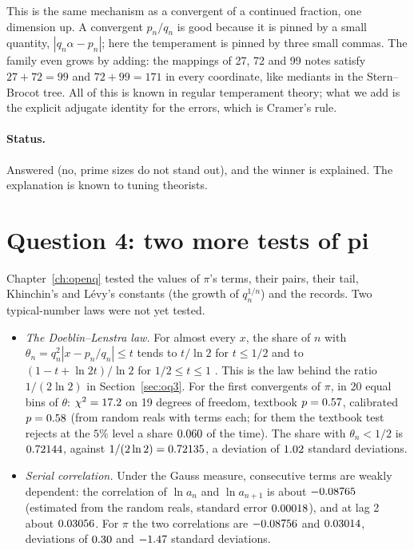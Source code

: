 This is the same mechanism as a convergent of a continued fraction, one dimension up. A convergent $p_n/q_n$ is good because it is pinned by a small quantity, $|q_n\alpha - p_n|$; here the temperament is pinned by three small commas. The family even grows by adding: the mappings of 27, 72 and 99 notes satisfy $27 + 72 = 99$ and $72 + 99 = 171$ in every coordinate, like mediants in the Stern--Brocot tree. All of this is known in regular temperament theory; what we add is the explicit adjugate identity for the errors, which is Cramer's rule.

\paragraph{Status.} Answered (no, prime sizes do not stand out), and the winner is explained. The explanation is known to tuning theorists.

\section{Question 4: two more tests of pi}\label{sec:ob4}

Chapter~\ref{ch:openq} tested the values of $\pi$'s terms, their pairs, their tail, Khinchin's and Lévy's constants (the growth of $q_n^{1/n}$) and the records. Two typical-number laws were not yet tested.

\begin{itemize}
\item \emph{The Doeblin--Lenstra law.} For almost every $x$, the share of $n$ with $\theta_n = q_n^2|x - p_n/q_n| \le t$ tends to $t/\ln 2$ for $t \le 1/2$ and to $(1 - t + \ln 2t)/\ln 2$ for $1/2 \le t \le 1$ \citep{BosmaJagerWiedijk1983}. This is the law behind the ratio $1/(2\ln 2)$ in Section~\ref{sec:oq3}. For the first \ObThN{} convergents of $\pi$, in 20 equal bins of $\theta$: $\chi^2 = 17.2$ on 19 degrees of freedom, textbook $p = 0.57$, calibrated $p = 0.58$ (from \ObCalN{} random reals with \ObCalLen{} terms each; for them the textbook test rejects at the $5\%$ level a share $0.060$ of the time). The share with $\theta_n < 1/2$ is $0.72144$, against $1/(2\ln 2) = 0.72135$, a deviation of $1.02$ standard deviations.
\item \emph{Serial correlation.} Under the Gauss measure, consecutive terms are weakly dependent: the correlation of $\ln a_n$ and $\ln a_{n+1}$ is about $-0.08765$ (estimated from the random reals, standard error $0.00018$), and at lag 2 about $0.03056$. For $\pi$ the two correlations are $-0.08756$ and $0.03014$, deviations of $0.30$ and $-1.47$ standard deviations.
\end{itemize}

